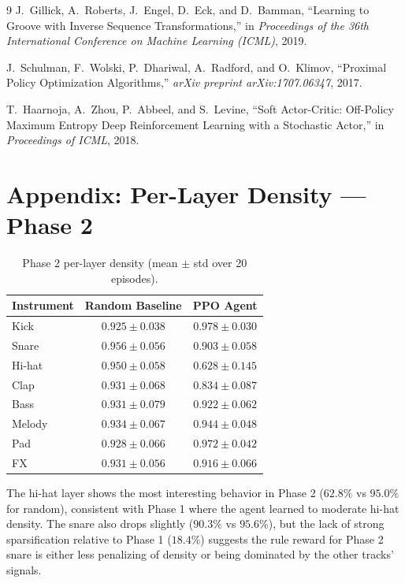 \documentclass[11pt]{article}
\begin{document}
\begin{thebibliography}{9}
J.~Gillick, A.~Roberts, J.~Engel, D.~Eck, and D.~Bamman,
``Learning to Groove with Inverse Sequence Transformations,''
in \textit{Proceedings of the 36th International Conference on Machine Learning (ICML)}, 2019.

J.~Schulman, F.~Wolski, P.~Dhariwal, A.~Radford, and O.~Klimov,
``Proximal Policy Optimization Algorithms,''
\textit{arXiv preprint arXiv:1707.06347}, 2017.

T.~Haarnoja, A.~Zhou, P.~Abbeel, and S.~Levine,
``Soft Actor-Critic: Off-Policy Maximum Entropy Deep Reinforcement Learning with a Stochastic Actor,''
in \textit{Proceedings of ICML}, 2018.
\end{thebibliography}

\appendix

\section{Appendix: Per-Layer Density --- Phase 2}

\begin{table}[H]
\centering
\caption{Phase 2 per-layer density (mean $\pm$ std over 20 episodes).}
\label{tab:phase2_density}
\begin{tabular}{lcc}
\toprule
\textbf{Instrument} & \textbf{Random Baseline} & \textbf{PPO Agent} \\
\midrule
Kick    & $0.925 \pm 0.038$ & $0.978 \pm 0.030$ \\
Snare   & $0.956 \pm 0.056$ & $0.903 \pm 0.058$ \\
Hi-hat  & $0.950 \pm 0.058$ & $0.628 \pm 0.145$ \\
Clap    & $0.931 \pm 0.068$ & $0.834 \pm 0.087$ \\
Bass    & $0.931 \pm 0.079$ & $0.922 \pm 0.062$ \\
Melody  & $0.934 \pm 0.067$ & $0.944 \pm 0.048$ \\
Pad     & $0.928 \pm 0.066$ & $0.972 \pm 0.042$ \\
FX      & $0.931 \pm 0.056$ & $0.916 \pm 0.066$ \\
\bottomrule
\end{tabular}
\end{table}

The hi-hat layer shows the most interesting behavior in Phase 2 ($62.8\%$ vs $95.0\%$ for random), consistent with Phase 1 where the agent learned to moderate hi-hat density. The snare also drops slightly ($90.3\%$ vs $95.6\%$), but the lack of strong sparsification relative to Phase 1 ($18.4\%$) suggests the rule reward for Phase 2 snare is either less penalizing of density or being dominated by the other tracks' signals.
\end{document}
